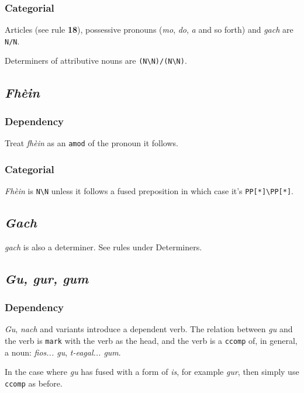 \documentclass[a4paper]{article}
\begin{document}
\subsubsection{Categorial}

 Articles (see rule {\bf 18}), possessive pronouns (\textit{mo}, \textit{do}, \textit{a} and so forth) and \textit{gach} are \texttt{N/N}.

 Determiners of attributive nouns are \texttt{(N\textbackslash N)/(N\textbackslash N)}.


\subsection{\textit{Fh\`ein}}

\subsubsection{Dependency}
 Treat \textit{fh\`ein} as an \texttt{amod} of the pronoun it follows.

\subsubsection{Categorial}
 \textit{Fh\`ein} is \texttt{N\textbackslash N} unless it follows a fused preposition in which case it's \texttt{PP[*]\textbackslash PP[*]}.


\subsection{\textit{Gach}}

\textit{gach} is also a determiner. See rules under Determiners.

\subsection{\textit{Gu, gur, gum}}
\subsubsection{Dependency}
 \textit{Gu}, \textit{nach} and variants introduce a dependent verb. The relation between \textit{gu} and the verb is \texttt{mark} with the verb as the head, and the verb is a \texttt{ccomp} of, in general, a noun: \textit{fios... gu}, \textit{t-eagal... gum}.

 In the case where \textit{gu} has fused with a form of \textit{is}, for example \textit{gur}, then simply use \texttt{ccomp} as before.
\end{document}
